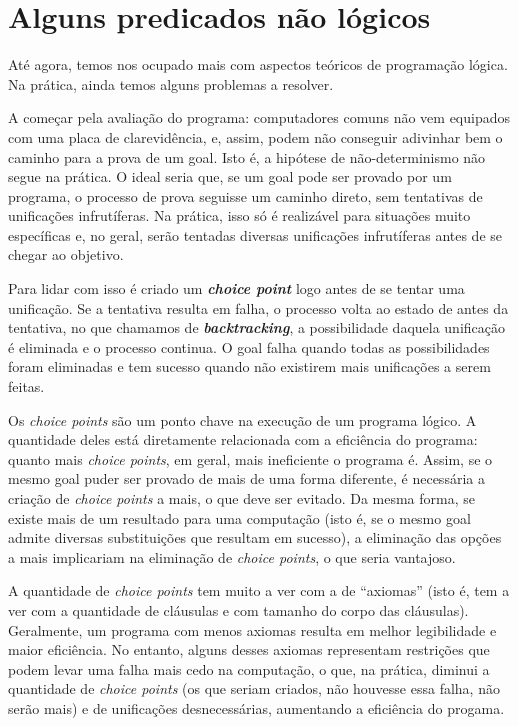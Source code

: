 \documentclass{article}
\begin{document}
\section{Alguns predicados não lógicos}

Até agora, temos nos ocupado mais com aspectos teóricos de programação lógica. Na prática, ainda temos alguns problemas a resolver.

A começar pela avaliação do programa: computadores comuns não vem equipados com uma placa de clarevidência, e, assim, podem não conseguir adivinhar bem o caminho para a prova de um goal. Isto é, a hipótese de não-determinismo não segue na prática. O ideal seria que, se um goal pode ser provado por um programa, o processo de prova seguisse um caminho direto, sem tentativas de unificações infrutíferas. Na prática, isso só é realizável para situações muito específicas e, no geral, serão tentadas
diversas unificações infrutíferas antes de se chegar ao objetivo.

Para lidar com isso é criado um \textbf{\textit{choice point}} logo antes de se tentar uma unificação. Se a tentativa resulta em falha, o processo volta ao estado de antes da tentativa, no que chamamos de \textbf\textit{{backtracking}}, a possibilidade daquela unificação é eliminada e o processo continua. O goal falha quando todas as possibilidades foram eliminadas e tem sucesso quando não existirem mais unificações a serem feitas.

Os \textit{choice points} são um ponto chave na execução de um programa lógico. A quantidade deles está diretamente relacionada com a eficiência do programa: quanto mais \textit{choice points}, em geral, mais ineficiente o programa é. Assim, se o mesmo goal puder ser provado de mais de uma forma diferente, é necessária a criação de \textit{choice points} a mais, o que deve ser evitado. Da mesma forma, se existe mais de um resultado para uma computação (isto é, se o mesmo goal admite diversas substituições que resultam em sucesso), a eliminação das opções a mais implicariam na eliminação de \textit{choice points}, o que seria vantajoso.

A quantidade de \textit{choice points} tem muito a ver com a de ``axiomas'' (isto é, tem a ver com a quantidade de cláusulas e com tamanho do corpo das cláusulas). Geralmente, um programa com menos axiomas resulta em melhor legibilidade e maior eficiência. No entanto, alguns desses axiomas representam restrições que podem levar uma falha mais cedo na computação, o que, na prática, diminui a quantidade de \textit{choice points} (os que seriam criados, não houvesse essa
falha, não serão mais) e de unificações
desnecessárias, aumentando a eficiência do progama.
\end{document}

